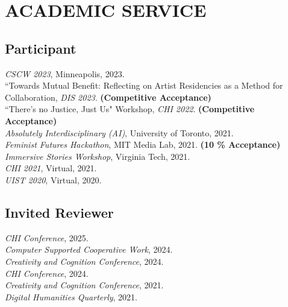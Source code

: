  \section{ACADEMIC SERVICE}

 \subsection{Participant}
 \emph{CSCW 2023}, Minneapolis, 2023.\\
 ``Towards Mutual Benefit: Reflecting on Artist Residencies as a Method for Collaboration, \emph{DIS 2023}. \textbf{(Competitive Acceptance)}\\
``There's no Justice, Just Us" Workshop, \emph{CHI 2022}. \textbf{(Competitive Acceptance)}\\
\emph{Absolutely Interdisciplinary (AI)}, University of Toronto, 2021.\\
\emph{Feminist Futures Hackathon}, MIT Media Lab, 2021. \textbf{(10 \% Acceptance)}\\
\emph{Immersive Stories Workshop}, Virginia Tech, 2021.\\
\emph{CHI 2021}, Virtual, 2021. \\
\emph{UIST 2020}, Virtual, 2020. 

  \subsection{Invited Reviewer}
     \emph{CHI Conference}, 2025. \\
     \emph{Computer Supported Cooperative Work}, 2024. \\
     \emph{Creativity and Cognition Conference}, 2024. \\
   \emph{CHI Conference}, 2024. \\
 \emph{Creativity and Cognition Conference}, 2021. \\
  \emph{Digital Humanities Quarterly}, 2021. \\